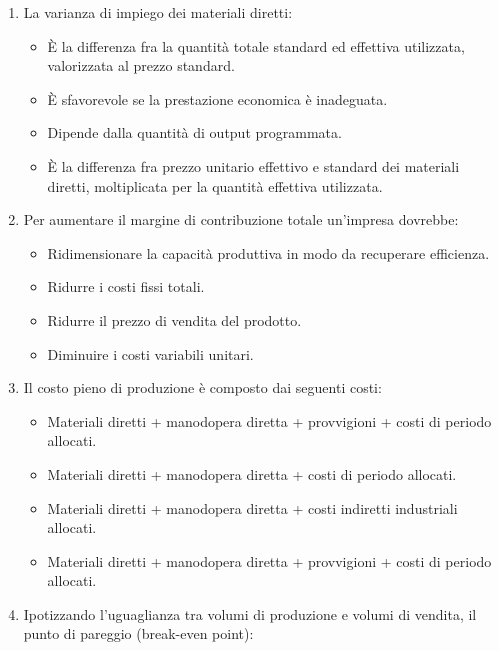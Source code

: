 \documentclass{article}
\begin{document}
\begin{enumerate}
    \item La varianza di impiego dei materiali diretti:
          \begin{itemize}
              \item[\checkmark] È la differenza fra la quantità totale standard ed effettiva utilizzata, valorizzata al prezzo standard.
              \item[\sout{B.}] È sfavorevole se la prestazione economica è inadeguata.
              \item[\sout{C.}] Dipende dalla quantità di output programmata.
              \item[\sout{D.}] È la differenza fra prezzo unitario effettivo e standard dei materiali diretti, moltiplicata per la quantità effettiva utilizzata.
          \end{itemize}
    \item Per aumentare il margine di contribuzione totale un'impresa dovrebbe:
          \begin{itemize}
              \item[\sout{A.}] Ridimensionare la capacità produttiva in modo da recuperare efficienza.
              \item[\sout{B.}] Ridurre i costi fissi totali.
              \item[\sout{C.}] Ridurre il prezzo di vendita del prodotto.
              \item[\checkmark] Diminuire i costi variabili unitari.
          \end{itemize}
    \item Il costo pieno di produzione è composto dai seguenti costi:
          \begin{itemize}
              \item[\sout{A.}] Materiali diretti + manodopera diretta + provvigioni + costi di periodo allocati.
              \item[\sout{B.}] Materiali diretti + manodopera diretta + costi di periodo allocati.
              \item[\checkmark] Materiali diretti + manodopera diretta + costi indiretti industriali allocati.
              \item[\sout{C.}] Materiali diretti + manodopera diretta + provvigioni + costi di periodo allocati.
          \end{itemize}
    \item Ipotizzando l'uguaglianza tra volumi di produzione e volumi di vendita, il punto di pareggio (break-even point):

\end{enumerate}
\end{document}
